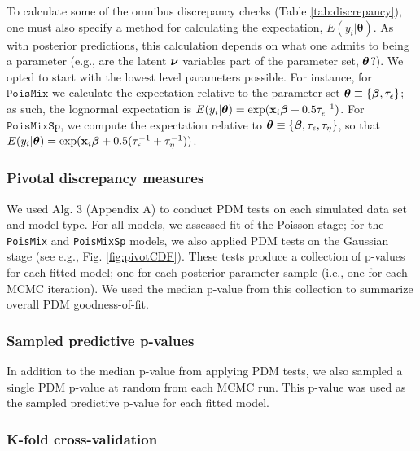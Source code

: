 \documentclass[12pt,english]{article}
\begin{document}
\begin{spacing}{1.9}
To calculate some of the omnibus discrepancy checks (Table
\ref{tab:discrepancy}), one must also specify a method for calculating
the expectation, $E(y_i|\boldsymbol{\theta})$.  As with posterior
predictions, this calculation depends on what one admits to being a
parameter (e.g., are the latent $\boldsymbol{\nu}$ variables part of the
parameter set, $\boldsymbol{\theta}$?).  We opted to start with the lowest level
parameters possible.  For instance, for $\texttt{PoisMix}$ we
calculate the expectation relative to the parameter set
$\boldsymbol{\theta} \equiv \{ \boldsymbol{\beta}, \tau_\epsilon \}$; as such,
the lognormal expectation is
$E(y_i|\boldsymbol{\theta}) = \exp({\bf x}_i \boldsymbol{\beta} + 0.5
\tau_\epsilon^{-1})$.  For $\texttt{PoisMixSp}$, we compute the
expectation relative to
$\boldsymbol{\theta} \equiv \{ \boldsymbol{\beta}, \tau_\epsilon, \tau_\eta \}$, so that
$E(y_i|\boldsymbol{\theta}) = \exp({\bf x}_i \boldsymbol{\beta} + 0.5
(\tau_\epsilon^{-1} + \tau_\eta^{-1}))$.

\subsubsection{Pivotal discrepancy measures}

We used Alg. 3 (Appendix A) to conduct PDM tests on each simulated
data set and model type.  For all models, we assessed fit of the
Poisson stage; for the \texttt{PoisMix} and \texttt{PoisMixSp} models,
we also applied PDM tests on the Gaussian stage (see e.g.,
Fig. \ref{fig:pivotCDF}).  These tests produce a collection of
p-values for each fitted model; one for each posterior parameter
sample (i.e., one for each MCMC iteration).  We used the median
p-value from this collection to summarize overall PDM goodness-of-fit.

\subsubsection{Sampled predictive p-values}

In addition to the median p-value from applying PDM tests, we also
sampled a single PDM p-value at random from each MCMC run.  This
p-value was used as the sampled predictive p-value for each fitted
model.

\subsubsection{K-fold cross-validation}


\end{spacing}
\end{document}
